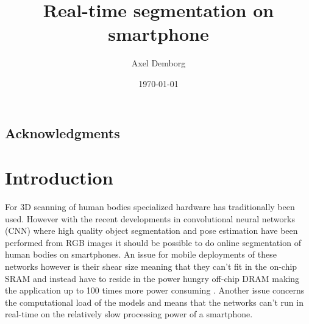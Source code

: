 \documentclass{kththesis}
\title{Real-time segmentation on smartphone}
\author{Axel Demborg}
\date{\today}
\begin{document}
\frontmatter

\titlepage

\begin{abstract}

\end{abstract}


\begin{otherlanguage}{swedish}
  \begin{abstract}
  \end{abstract}
\end{otherlanguage}

\section*{Acknowledgments}




\tableofcontents


\mainmatter


\chapter{Introduction}
For 3D scanning of human bodies specialized hardware has traditionally been used. However with the recent developments in convolutional neural networks (CNN) where high quality object segmentation \parencite{BriefHistory} and pose estimation \parencite{he2017mask} have been performed from RGB images it should be possible to do online segmentation of human bodies on smartphones. An issue for mobile deployments of these networks however is their shear size meaning that they can't fit in the on-chip SRAM and instead have to reside in the power hungry off-chip DRAM making the application up to 100 times more power consuming \parencite{han2015learning}. Another issue concerns the computational load of the models and means that the networks can't run in real-time on the relatively slow processing power of a smartphone.
\end{document}
